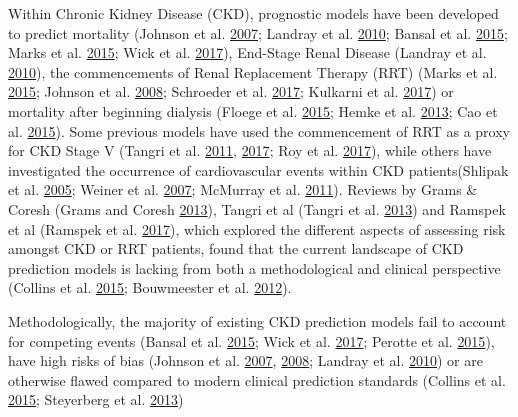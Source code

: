 \documentclass[
]{article}
\begin{document}
Within Chronic Kidney Disease (CKD), prognostic models have been developed to predict mortality (Johnson et al. \protect\hyperlink{ref-johnson_predicting_2007}{2007}; Landray et al. \protect\hyperlink{ref-landray_prediction_2010}{2010}; Bansal et al. \protect\hyperlink{ref-bansal_development_2015}{2015}; Marks et al. \protect\hyperlink{ref-marks_looking_2015}{2015}; Wick et al. \protect\hyperlink{ref-wick_clinical_2017}{2017}), End-Stage Renal Disease (Landray et al. \protect\hyperlink{ref-landray_prediction_2010}{2010}), the commencements of Renal Replacement Therapy (RRT) (Marks et al. \protect\hyperlink{ref-marks_looking_2015}{2015}; Johnson et al. \protect\hyperlink{ref-johnson_predicting_2008}{2008}; Schroeder et al. \protect\hyperlink{ref-schroeder_predicting_2017}{2017}; Kulkarni et al. \protect\hyperlink{ref-kulkarni_transition_2017}{2017}) or mortality after beginning dialysis (Floege et al. \protect\hyperlink{ref-floege_development_2015}{2015}; Hemke et al. \protect\hyperlink{ref-hemke_survival_2013}{2013}; Cao et al. \protect\hyperlink{ref-cao_predicting_2015}{2015}). Some previous models have used the commencement of RRT as a proxy for CKD Stage V (Tangri et al. \protect\hyperlink{ref-tangri_predictive_2011}{2011}, \protect\hyperlink{ref-tangri_dynamic_2017}{2017}; Roy et al. \protect\hyperlink{ref-roy_statistical_2017}{2017}), while others have investigated the occurrence of cardiovascular events within CKD patients(Shlipak et al. \protect\hyperlink{ref-shlipak_cardiovascular_2005}{2005}; Weiner et al. \protect\hyperlink{ref-weiner_framingham_2007}{2007}; McMurray et al. \protect\hyperlink{ref-mcmurray_predictors_2011}{2011}). Reviews by Grams \& Coresh (Grams and Coresh \protect\hyperlink{ref-grams_assessing_2013}{2013}), Tangri et al (Tangri et al. \protect\hyperlink{ref-tangri_risk_2013}{2013}) and Ramspek et al (Ramspek et al. \protect\hyperlink{ref-ramspek_prediction_2017}{2017}), which explored the different aspects of assessing risk amongst CKD or RRT patients, found that the current landscape of CKD prediction models is lacking from both a methodological and clinical perspective (Collins et al. \protect\hyperlink{ref-collins_transparent_2015}{2015}; Bouwmeester et al. \protect\hyperlink{ref-bouwmeester_reporting_2012-1}{2012}).

Methodologically, the majority of existing CKD prediction models fail to account for competing events (Bansal et al. \protect\hyperlink{ref-bansal_development_2015}{2015}; Wick et al. \protect\hyperlink{ref-wick_clinical_2017}{2017}; Perotte et al. \protect\hyperlink{ref-perotte_risk_2015}{2015}), have high risks of bias (Johnson et al. \protect\hyperlink{ref-johnson_predicting_2007}{2007}, \protect\hyperlink{ref-johnson_predicting_2008}{2008}; Landray et al. \protect\hyperlink{ref-landray_prediction_2010}{2010}) or are otherwise flawed compared to modern clinical prediction standards (Collins et al. \protect\hyperlink{ref-collins_transparent_2015}{2015}; Steyerberg et al. \protect\hyperlink{ref-steyerberg_prognosis_2013}{2013})
\end{document}
